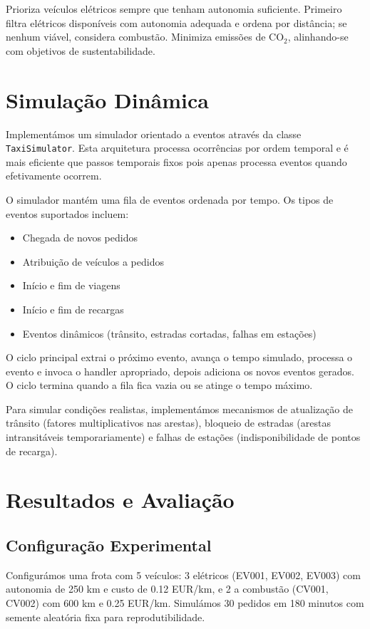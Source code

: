 \documentclass[11pt,a4paper]{article}
\begin{document}
Prioriza veículos elétricos sempre que tenham autonomia suficiente. Primeiro filtra elétricos disponíveis com autonomia adequada e ordena por distância; se nenhum viável, considera combustão. Minimiza emissões de CO$_2$, alinhando-se com objetivos de sustentabilidade.

\section{Simulação Dinâmica}

Implementámos um simulador orientado a eventos através da classe \texttt{TaxiSimulator}. Esta arquitetura processa ocorrências por ordem temporal e é mais eficiente que passos temporais fixos pois apenas processa eventos quando efetivamente ocorrem.

O simulador mantém uma fila de eventos ordenada por tempo. Os tipos de eventos suportados incluem:
\begin{itemize}
    \item Chegada de novos pedidos
    \item Atribuição de veículos a pedidos
    \item Início e fim de viagens
    \item Início e fim de recargas
    \item Eventos dinâmicos (trânsito, estradas cortadas, falhas em estações)
\end{itemize}

O ciclo principal extrai o próximo evento, avança o tempo simulado, processa o evento e invoca o handler apropriado, depois adiciona os novos eventos gerados. O ciclo termina quando a fila fica vazia ou se atinge o tempo máximo.

Para simular condições realistas, implementámos mecanismos de atualização de trânsito (fatores multiplicativos nas arestas), bloqueio de estradas (arestas intransitáveis temporariamente) e falhas de estações (indisponibilidade de pontos de recarga).

\section{Resultados e Avaliação}

\subsection{Configuração Experimental}

Configurámos uma frota com 5 veículos: 3 elétricos (EV001, EV002, EV003) com autonomia de 250 km e custo de 0.12 EUR/km, e 2 a combustão (CV001, CV002) com 600 km e 0.25 EUR/km. Simulámos 30 pedidos em 180 minutos com semente aleatória fixa para reprodutibilidade.
\end{document}
